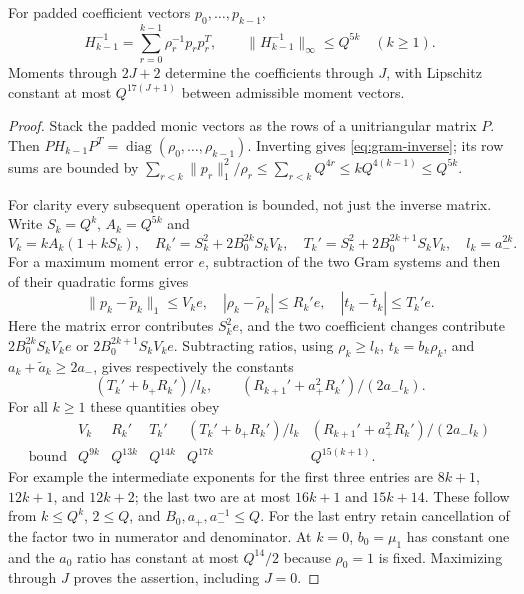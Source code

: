 \begin{lemma}
\label{lem:gram}
For padded coefficient vectors $p_0,\ldots,p_{k-1}$,
\begin{equation}
 H_{k-1}^{-1}=\sum_{r=0}^{k-1}\rho_r^{-1}p_rp_r^T,
 \qquad \|H_{k-1}^{-1}\|_\infty\le Q^{5k}\quad(k\ge1).
 \label{eq:gram-inverse}
\end{equation}
Moments through $2J+2$ determine the coefficients through $J$, with Lipschitz
constant at most $Q^{17(J+1)}$ between admissible moment vectors.
\end{lemma}
\begin{proof}
Stack the padded monic vectors as the rows of a unitriangular matrix $P$.
Then $PH_{k-1}P^T=\operatorname{diag}(\rho_0,\ldots,\rho_{k-1})$.
Inverting gives \eqref{eq:gram-inverse}; its row sums are bounded by
$\sum_{r<k}\|p_r\|_1^2/\rho_r\le\sum_{r<k}Q^{4r}\le kQ^{4(k-1)}\le Q^{5k}$.

For clarity every subsequent operation is bounded, not just the inverse
matrix. Write $S_k=Q^k$, $A_k=Q^{5k}$ and
\[
 V_k=kA_k(1+kS_k),\quad
 R_k'=S_k^2+2B_0^{2k}S_kV_k,\quad
 T_k'=S_k^2+2B_0^{2k+1}S_kV_k,\quad l_k=a_-^{2k}.
\]
For a maximum moment error $e$, subtraction of the two Gram systems and then
of their quadratic forms gives
\[
 \|p_k-\widetilde p_k\|_1\le V_ke,\quad
 |\rho_k-\widetilde\rho_k|\le R_k'e,\quad
 |t_k-\widetilde t_k|\le T_k'e.
\]
Here the matrix error contributes $S_k^2e$, and the two coefficient changes
contribute $2B_0^{2k}S_kV_ke$ or $2B_0^{2k+1}S_kV_ke$. Subtracting ratios,
using $\rho_k\ge l_k$, $t_k=b_k\rho_k$, and
$a_k+\widetilde a_k\ge2a_-$, gives respectively the constants
\[
 (T_k'+b_+R_k')/l_k,
 \qquad (R_{k+1}'+a_+^2R_k')/(2a_-l_k).
\]
For all $k\ge1$ these quantities obey
\[
 \begin{array}{c|ccccc}
 &V_k&R_k'&T_k'&(T_k'+b_+R_k')/l_k&
 (R_{k+1}'+a_+^2R_k')/(2a_-l_k)\\\hline
 \text{bound}&Q^{9k}&Q^{13k}&Q^{14k}&Q^{17k}&Q^{15(k+1)}.
 \end{array}
\]
For example the intermediate exponents for the first three entries are
$8k+1$, $12k+1$, and $12k+2$; the last two are at most $16k+1$ and
$15k+14$. These follow from $k\le Q^k$, $2\le Q$, and
$B_0,a_+,a_-^{-1}\le Q$. For the last entry retain cancellation of the
factor two in numerator and denominator. At $k=0$, $b_0=\mu_1$ has constant
one and the $a_0$ ratio has constant at most $Q^{14}/2$ because $\rho_0=1$
is fixed. Maximizing through $J$ proves the assertion, including $J=0$.
\end{proof}

